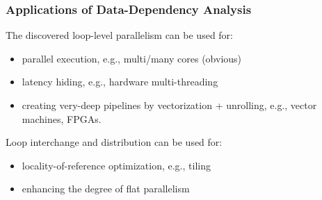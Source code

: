 \documentclass[rgb,dvipsnames]{beamer}
\newcommand{\emphh}[1]{\textcolor{CosGreen}{ #1}}
\begin{document}
\begin{frame}[fragile,t]
  \frametitle{Applications of Data-Dependency Analysis}

\emphh{The discovered loop-level parallelism can be used for:}
\begin{itemize}
    \item parallel execution, e.g., multi/many cores (obvious)\medskip
    \item latency hiding, e.g., hardware multi-threading\medskip
    \item creating very-deep pipelines by vectorization + unrolling, 
            e.g., vector machines, FPGAs.\medskip
\end{itemize}\bigskip

\emphh{Loop interchange and distribution can be used for:}
\begin{itemize}
    \item locality-of-reference optimization, e.g., tiling
    \item enhancing the degree of flat parallelism
\end{itemize}

\end{frame}
\end{document}

